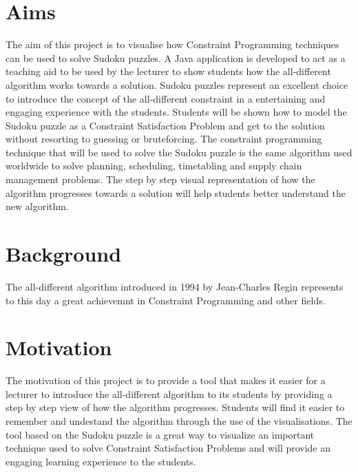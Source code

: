 \documentclass{l4proj}
\begin{document}
\section{Aims}
\noindent The aim of this project is to visualise how Constraint Programming techniques can be used to solve Sudoku puzzles. A Java application is developed to act as a teaching aid to be used by the lecturer to show students how the all-different algorithm works towards a solution. Sudoku puzzles represent an excellent choice to introduce the concept of the all-different constraint in a entertaining and engaging experience with the students. Students will be shown how to model the Sudoku puzzle as a Constraint Satisfaction Problem and get to the solution without resorting to guessing or bruteforcing. The constraint programming technique that will be used to solve the Sudoku puzzle is the same algorithm used worldwide to solve planning, scheduling, timetabling and supply chain management problems. The step by step visual representation of how the algorithm progresses towards a solution will help students better understand the new algorithm.

\section{Background}
The all-different algorithm introduced in 1994 by Jean-Charles Regin represents to this day a great achievemnt in Constraint Programming and other fields. 

\section{Motivation}
The motivation of this project is to provide a tool that makes it easier for a lecturer to introduce the all-different algorithm to its students by providing a step by step view of how the algorithm progresses. Students will find it easier to remember and undestand the algorithm through the use of the visualisations. The tool based on the Sudoku puzzle is a great way to visualize an important technique used to solve Constraint Satisfaction Problems and will provide an engaging learning experience to the students.
\end{document}
